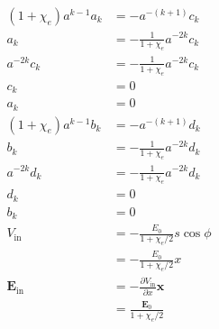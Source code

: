 \documentclass{article}
\renewcommand{\vec}[1]{\boldsymbol{\mathbf{#1}}}
\newcommand{\uvec}[1]{\hat{\vec{#1}}}
\begin{document}
\begin{align*}
  (1 + \chi_e) a^{k - 1} a_k & = -a^{-(k + 1)} c_k                                 \\
  a_k                        & = -\frac{1}{1 + \chi_e} a^{-2 k} c_k                \\
  a^{-2 k} c_k               & = -\frac{1}{1 + \chi_e} a^{-2 k} c_k                \\
  c_k                        & = 0                                                 \\
  a_k                        & = 0                                                 \\
  (1 + \chi_e) a^{k - 1} b_k & = -a^{-(k + 1)} d_k                                 \\
  b_k                        & = -\frac{1}{1 + \chi_e} a^{-2 k} d_k                \\
  a^{-2 k} d_k               & = -\frac{1}{1 + \chi_e} a^{-2 k} d_k                \\
  d_k                        & = 0                                                 \\
  b_k                        & = 0                                                 \\
  V_\text{in}                & = -\frac{E_0}{1 + \chi_e / 2} s \cos \phi           \\
                             & = -\frac{E_0}{1 + \chi_e / 2} x                     \\
  \vec{E}_\text{in}          & = -\frac{\partial V_\text{in}}{\partial x} \uvec{x} \\
                             & = \frac{\vec{E}_0}{1 + \chi_e / 2}
\end{align*}

\subsection{}
\end{document}
